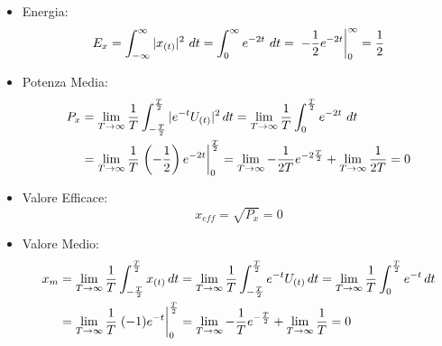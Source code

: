         \begin{itemize}
            \item {Energia:
                \[
                    E_{x} = \int_{-\infty}^{\infty} |x_{(t)}|^2 \ dt = \int_{0}^{\infty} e^{-2t}\ dt = \eval*{-\frac{1}{2} e^{-2t}}_{0}^{\infty} = \frac{1}{2} 
                \]
            }
            \item {Potenza Media:
                \begin{align}
                    P_{x} & =\lim_{T\rightarrow\infty}  \frac{1}{T} \int_{-\frac{T}{2}}^{\frac{T}{2}}  |e^{-t}U_{(t)}|^2 \,dt =\lim_{T\rightarrow\infty} \frac{1}{T} \int_{0}^{\frac{T}{2}} e^{-2t}\ dt \nonumber \\
                          & = \lim_{T\rightarrow\infty} \frac{1}{T} \eval*{\left(-\frac{1}{2}\right) e^{-2t}}_{0}^{\frac{T}{2}} =\lim_{T\rightarrow\infty}-\frac{1}{2T} e^{-2\frac{T}{2}} + \lim_{T\rightarrow\infty} \frac{1}{2T} = 0 \nonumber 
                \end{align}
            }
            \item {Valore Efficace:
                \[
                    x_{eff} = \sqrt{P_{x}} = 0 
                \]
            }
            \item {Valore Medio:
                    \begin{align}
                        x_{m} & = \lim_{T\rightarrow\infty} \frac{1}{T} \int_{-\frac{T}{2}}^{\frac{T}{2}}  x_{(t)} \,dt =\lim_{T\rightarrow\infty} \frac{1}{T} \int_{-\frac{T}{2}}^{\frac{T}{2}} e^{-t}U_{(t)}\,dt = \lim_{T\rightarrow\infty} \frac{1}{T} \int_{0}^{\frac{T}{2}} e^{-t}\,dt \nonumber \\
                              & = \lim_{T\rightarrow\infty} \frac{1}{T} \eval*{(-1) e^{-t}}_{0}^{\frac{T}{2}} =  \lim_{T\rightarrow\infty}-\frac{1}{T} e^{-\frac{T}{2}} + \lim_{T\rightarrow\infty} \frac{1}{T} = 0 \nonumber
                    \end{align}
            }
        \end{itemize}
        
        \pagebreak
